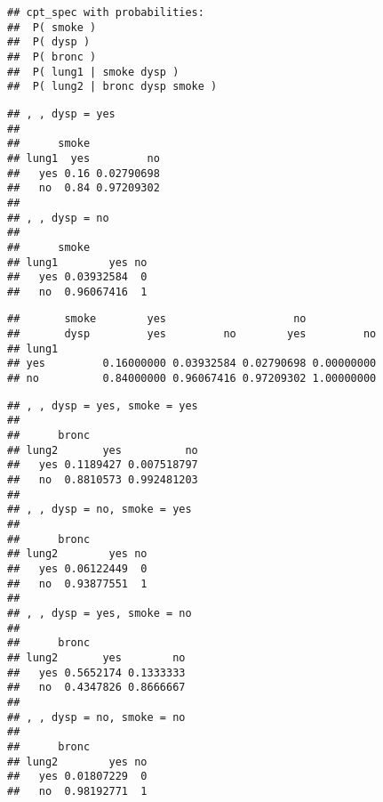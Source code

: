 \documentclass[
]{article}
\newenvironment{Shaded}{\begin{snugshade}}{\end{snugshade}}
\newcommand{\DataTypeTok}[1]{\textcolor[rgb]{0.13,0.29,0.53}{#1}}
\newcommand{\DecValTok}[1]{\textcolor[rgb]{0.00,0.00,0.81}{#1}}
\newcommand{\KeywordTok}[1]{\textcolor[rgb]{0.13,0.29,0.53}{\textbf{#1}}}
\newcommand{\NormalTok}[1]{#1}
\newcommand{\OperatorTok}[1]{\textcolor[rgb]{0.81,0.36,0.00}{\textbf{#1}}}
\begin{document}
\begin{verbatim}
## cpt_spec with probabilities:
##  P( smoke )
##  P( dysp )
##  P( bronc )
##  P( lung1 | smoke dysp )
##  P( lung2 | bronc dysp smoke )
\end{verbatim}

\begin{Shaded}
\end{Shaded}

\begin{verbatim}
## , , dysp = yes
## 
##      smoke
## lung1  yes         no
##   yes 0.16 0.02790698
##   no  0.84 0.97209302
## 
## , , dysp = no
## 
##      smoke
## lung1        yes no
##   yes 0.03932584  0
##   no  0.96067416  1
\end{verbatim}

\begin{Shaded}
\end{Shaded}

\begin{verbatim}
##       smoke        yes                    no           
##       dysp         yes         no        yes         no
## lung1                                                  
## yes         0.16000000 0.03932584 0.02790698 0.00000000
## no          0.84000000 0.96067416 0.97209302 1.00000000
\end{verbatim}

\begin{Shaded}
\end{Shaded}

\begin{verbatim}
## , , dysp = yes, smoke = yes
## 
##      bronc
## lung2       yes          no
##   yes 0.1189427 0.007518797
##   no  0.8810573 0.992481203
## 
## , , dysp = no, smoke = yes
## 
##      bronc
## lung2        yes no
##   yes 0.06122449  0
##   no  0.93877551  1
## 
## , , dysp = yes, smoke = no
## 
##      bronc
## lung2       yes        no
##   yes 0.5652174 0.1333333
##   no  0.4347826 0.8666667
## 
## , , dysp = no, smoke = no
## 
##      bronc
## lung2        yes no
##   yes 0.01807229  0
##   no  0.98192771  1
\end{verbatim}
\end{document}
